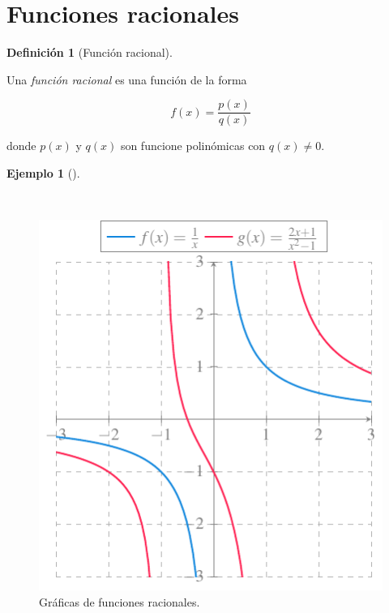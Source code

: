 \documentclass[
  a4paper,
]{scrreport}
\theoremstyle{definition}
\newtheorem{example}{Ejemplo}[chapter]
\theoremstyle{plain}
\theoremstyle{definition}
\newtheorem{definition}{Definición}[chapter]
\theoremstyle{definition}
\theoremstyle{plain}
\theoremstyle{plain}
\theoremstyle{remark}
\begin{document}
\section{Funciones racionales}\label{funciones-racionales}

\begin{definition}[Función
racional]\protect\hypertarget{def-funcion-racional}{}\label{def-funcion-racional}

Una \emph{función racional} es una función de la forma

\[f(x)=\frac{p(x)}{q(x)}\]

donde \(p(x)\) y \(q(x)\) son funcione polinómicas con \(q(x)\neq 0\).

\end{definition}

\begin{example}[]\protect\hypertarget{exm-funcion-racional}{}\label{exm-funcion-racional}

~

\begin{figure}[H]

{\centering \includegraphics{./img/funciones/funcion-racional.pdf}

}

\caption{Gráficas de funciones racionales.}

\end{figure}%

\end{example}
\end{document}
